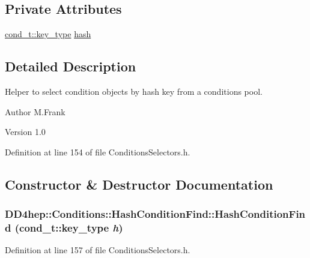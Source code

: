 \subsection*{Private Attributes}
\begin{DoxyCompactItemize}
\item 
\hyperlink{class_d_d4hep_1_1_conditions_1_1_condition_a7528efa762e8cc072ef80ea67c3531f9}{cond\_\-t::key\_\-type} \hyperlink{class_d_d4hep_1_1_conditions_1_1_hash_condition_find_a9be86da61865f479161109ec62efa26a}{hash}
\end{DoxyCompactItemize}


\subsection{Detailed Description}
Helper to select condition objects by hash key from a conditions pool. \begin{DoxyAuthor}{Author}
M.Frank 
\end{DoxyAuthor}
\begin{DoxyVersion}{Version}
1.0 
\end{DoxyVersion}


Definition at line 154 of file ConditionsSelectors.h.

\subsection{Constructor \& Destructor Documentation}
\hypertarget{class_d_d4hep_1_1_conditions_1_1_hash_condition_find_a3fd89cf5e4783fb24a05436db39274ff}{
\subsubsection[{HashConditionFind}]{\setlength{\rightskip}{0pt plus 5cm}DD4hep::Conditions::HashConditionFind::HashConditionFind ({\bf cond\_\-t::key\_\-type} {\em h})}}
\label{class_d_d4hep_1_1_conditions_1_1_hash_condition_find_a3fd89cf5e4783fb24a05436db39274ff}


Definition at line 157 of file ConditionsSelectors.h.

